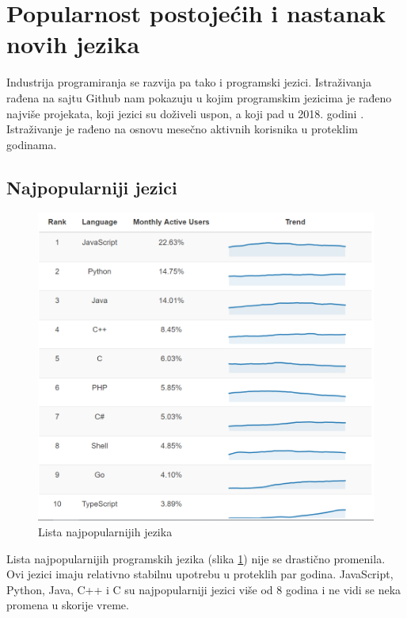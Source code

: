 \documentclass[a4paper]{article}
\begin{document}
\section{Popularnost postojećih i nastanak novih jezika}
\label{sec:globalni razvoj}

Industrija programiranja se razvija pa tako i programski jezici. Istraživanja rađena na sajtu Github nam pokazuju u kojim programskim jezicima je rađeno najviše projekata, koji jezici su doživeli uspon, a koji pad u 2018. godini \cite{github}. Istraživanje je rađeno na osnovu mesečno aktivnih korisnika u proteklim godinama.

\subsection{Najpopularniji jezici}
\label{subsec:najpopularniji jezici}

\begin{figure}[h!]
\begin{center}
\includegraphics[scale=0.4]{slike/listaNajpopularnijihJezika.png}
\end{center}
\caption{Lista najpopularnijih jezika}
\label{fig:listaNajpopularnijihJezika}
\end{figure}

Lista najpopularnijih programskih jezika (slika \ref{fig:listaNajpopularnijihJezika}) nije se drastično promenila. Ovi jezici imaju relativno stabilnu upotrebu u proteklih par godina. JavaScript, Python, Java, C++ i C su najpopularniji jezici više od 8 godina i ne vidi se neka promena u skorije vreme.
\end{document}
